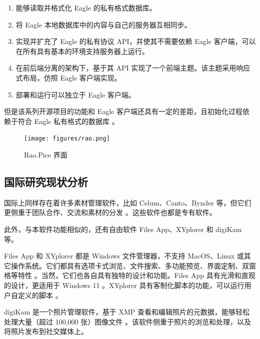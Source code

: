 \begin{enumerate}
    \item 能够读取并格式化 Eagle 的私有格式数据库。
    \item 将 Eagle 本地数据库中的内容与自己的服务器互相同步。
    \item 实现并扩充了 Eagle 的私有协议 API，并使其不需要依赖 Eagle 客户端，可以在所有具有基本的环境支持服务器上运行。
    \item 在前后端分离的架构下，基于其 API 实现了一个前端主题。该主题采用响应式布局，仿照 Eagle 客户端实现。
    \item 部署和运行可以独立于 Eagle 客户端。
\end{enumerate}

但是该系列开源项目的功能和 Eagle 客户端还具有一定的差距，且初始化过程依赖于符合 Eagle 私有格式的数据库 \cite{rao}。

\begin{figure}[h]
    \centering
    \texttt{[image: figures/rao.png]}
    \caption{Rao.Pice 界面}
    \label{fig:rao}
\end{figure}

\subsection{国际研究现状分析}

国际上同样存在着许多素材管理软件，比如 Celum、Canto、Bynder 等，但它们更侧重于团队合作、交流和素材的分发 \cite{celum} \cite{canto} \cite{bynder}。这些软件也都是专有软件。

此外，与本软件功能相似的，还有自由软件 Files App、XYplorer 和 digiKam 等。

Files App 和 XYplorer 都是 Windows 文件管理器，不支持 MacOS、Linux 或其它操作系统。它们都具有选项卡式浏览、文件搜索、多功能预览、界面定制、双窗格等特性 \cite{filesapp} \cite{xyplorer}。当然，它们也各自具有独特的设计和功能。Files App 具有光滑和直观的设计，更适用于 Windows 11 \cite{filesapp}。XYplorer 具有客制化脚本的功能，可以运行用户自定义的脚本 \cite{xyplorer}。

digiKam 是一个照片管理软件，基于 XMP 查看和编辑照片的元数据，能够轻松处理大量（超过 100,000 张）图像文件 \cite{digikam}。该软件侧重于照片的浏览和处理，以及将照片发布到社交媒体上。

